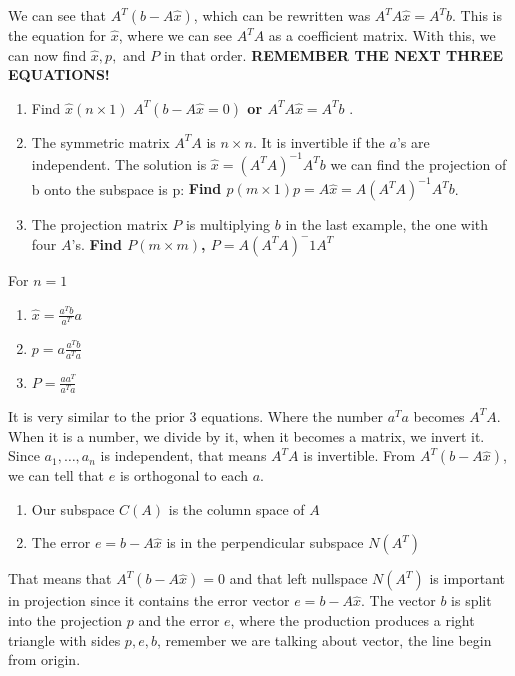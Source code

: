 We can see that \(A^{T}(b-A\hat{x})\), which can be rewritten was \(A^{T}A\hat{x} = A^{T}b\). This is the equation for \(\hat{x}\), where we can see \(A^{T}A\) as a coefficient matrix. With this, we can now find \(\hat{x}, p,\) and \(P\) in that order. \textbf{REMEMBER THE NEXT THREE EQUATIONS!}
\begin{enumerate}
    \item Find \(\hat{x} (n \times 1)\) \textbf{\(A^{T}(b - A\hat{x} = 0)\) or \(A^{T}A\hat{x} = A^{T}b\)} . 
    \item The symmetric matrix \(A^{T}A\) is \(n \times n\). It is invertible if the \(a\)'s are independent. The solution is \(\hat{x} = (A^{T}A)^{-1}A^{T}b\) we can find the projection of b onto the subspace is p: \textbf{Find \(p (m \times 1) p = A\hat{x} = A(A^{T}A)^{-1}A^{T}b \)}. 
    \item The projection matrix \(P\) is multiplying \(b\) in the last example, the one with four \(A\)'s. \textbf{Find \(P (m \times m)\), \(P = A(A^T A)^-1 A^T\)  }       
\end{enumerate} 

For \(n = 1\)
\begin{enumerate}
    \item \(\hat{x} = \frac{a^T b}{a^T}a\)
    \item \(p = a \frac{a^T b}{a^T a}\)
    \item \(P = \frac{a a^T}{a^T a}\)   
\end{enumerate} 

It is very similar to the prior 3 equations. Where the number \(a^T a\) becomes \(A^T A\). When it is a number, we divide by it, when it becomes a matrix, we invert it. Since \(a_1, \ldots, a_n\) is independent, that means \(A^T A\) is invertible. From \(A^T (b - A\hat{x})\), we can tell that \(e\) is orthogonal to each \(a\). 
\begin{enumerate}
    \item Our subspace \(C(A)\) is the column space of \(A\)
    \item The error \(e = b - A\hat{x}\) is in the perpendicular subspace \(N(A^T)\)    
\end{enumerate}       
That means that \(A^T (b - A\hat{x}) = 0\) and that left nullspace \(N(A^T)\) is important in projection since it contains the error vector \(e = b - A\hat{x}\). The vector \(b\) is split into the projection \(p\) and the error \(e\), where the production produces a right triangle with sides \(p, e, b\), remember we are talking about vector, the line begin from origin. 

